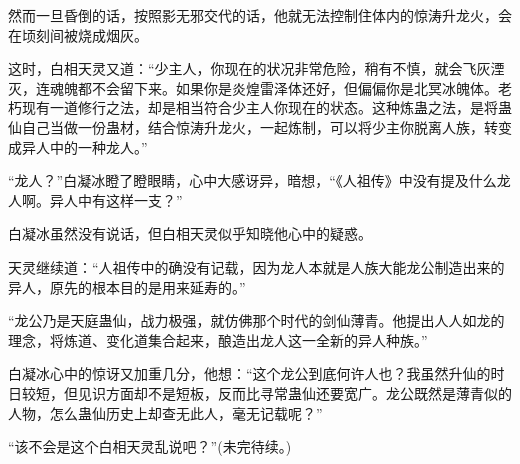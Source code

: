\begin{this_body}
然而一旦昏倒的话，按照影无邪交代的话，他就无法控制住体内的惊涛升龙火，会在顷刻间被烧成烟灰。

这时，白相天灵又道：“少主人，你现在的状况非常危险，稍有不慎，就会飞灰湮灭，连魂魄都不会留下来。如果你是炎煌雷泽体还好，但偏偏你是北冥冰魄体。老朽现有一道修行之法，却是相当符合少主人你现在的状态。这种炼蛊之法，是将蛊仙自己当做一份蛊材，结合惊涛升龙火，一起炼制，可以将少主你脱离人族，转变成异人中的一种龙人。”

“龙人？”白凝冰瞪了瞪眼睛，心中大感讶异，暗想，“《人祖传》中没有提及什么龙人啊。异人中有这样一支？”

白凝冰虽然没有说话，但白相天灵似乎知晓他心中的疑惑。

天灵继续道：“人祖传中的确没有记载，因为龙人本就是人族大能龙公制造出来的异人，原先的根本目的是用来延寿的。”

“龙公乃是天庭蛊仙，战力极强，就仿佛那个时代的剑仙薄青。他提出人人如龙的理念，将炼道、变化道集合起来，酿造出龙人这一全新的异人种族。”

白凝冰心中的惊讶又加重几分，他想：“这个龙公到底何许人也？我虽然升仙的时日较短，但见识方面却不是短板，反而比寻常蛊仙还要宽广。龙公既然是薄青似的人物，怎么蛊仙历史上却查无此人，毫无记载呢？”

“该不会是这个白相天灵乱说吧？”(未完待续。)

\end{this_body}

